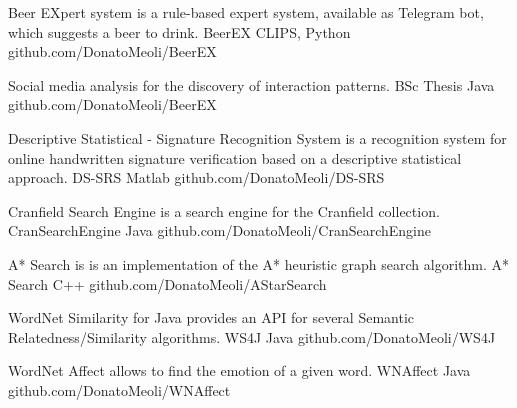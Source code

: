 

\begin{cventries}

  \cventry
    {Beer EXpert system is a rule-based expert system, available as Telegram bot, which suggests a beer to drink.} %
    {BeerEX} %
    {CLIPS, Python} %
    {github.com/DonatoMeoli/BeerEX} %
    {}

  \cventry
    {Social media analysis for the discovery of interaction patterns.} %
    {BSc Thesis} %
    {Java} %
    {github.com/DonatoMeoli/BeerEX} %
    {}

  \cventry
    {Descriptive Statistical - Signature Recognition System is a recognition system for online handwritten signature verification based on a descriptive statistical approach.} %
    {DS-SRS} %
    {Matlab} %
    {github.com/DonatoMeoli/DS-SRS} %
    {}

  \cventry
    {Cranfield Search Engine is a search engine for the Cranfield collection.} %
    {CranSearchEngine} %
    {Java} %
    {github.com/DonatoMeoli/CranSearchEngine} %
    {}

  \cventry
    {A* Search is  is an implementation of the A* heuristic graph search algorithm.} %
    {A* Search} %
    {C++} %
    {github.com/DonatoMeoli/AStarSearch} %
    {}

  \cventry
    {WordNet Similarity for Java provides an API for several Semantic Relatedness/Similarity algorithms.} %
    {WS4J} %
    {Java} %
    {github.com/DonatoMeoli/WS4J} %
    {}

  \cventry
    {WordNet Affect allows to find the emotion of a given word.} %
    {WNAffect} %
    {Java} %
    {github.com/DonatoMeoli/WNAffect} %
    {}

\end{cventries}
